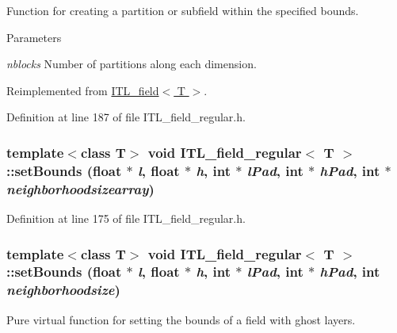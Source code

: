 Function for creating a partition or subfield within the specified bounds. 


\begin{DoxyParams}{Parameters}
\item[{\em nblocks}]Number of partitions along each dimension. \end{DoxyParams}


Reimplemented from \hyperlink{classITL__field_a5c7ecb94890c0dd7d730e881f530bbc2}{ITL\_\-field$<$ T $>$}.



Definition at line 187 of file ITL\_\-field\_\-regular.h.

\hypertarget{classITL__field__regular_af208eb6a35d5be3d496ff110f56e62d0}{
\subsubsection[{setBounds}]{\setlength{\rightskip}{0pt plus 5cm}template$<$class T$>$ void {\bf ITL\_\-field\_\-regular}$<$ T $>$::setBounds (float $\ast$ {\em l}, \/  float $\ast$ {\em h}, \/  int $\ast$ {\em lPad}, \/  int $\ast$ {\em hPad}, \/  int $\ast$ {\em neighborhoodsizearray})}}
\label{classITL__field__regular_af208eb6a35d5be3d496ff110f56e62d0}


Definition at line 175 of file ITL\_\-field\_\-regular.h.

\hypertarget{classITL__field__regular_aa7897cdf06b261236e0efdab0987be9f}{
\subsubsection[{setBounds}]{\setlength{\rightskip}{0pt plus 5cm}template$<$class T$>$ void {\bf ITL\_\-field\_\-regular}$<$ T $>$::setBounds (float $\ast$ {\em l}, \/  float $\ast$ {\em h}, \/  int $\ast$ {\em lPad}, \/  int $\ast$ {\em hPad}, \/  int {\em neighborhoodsize})}}
\label{classITL__field__regular_aa7897cdf06b261236e0efdab0987be9f}


Pure virtual function for setting the bounds of a field with ghost layers. 

